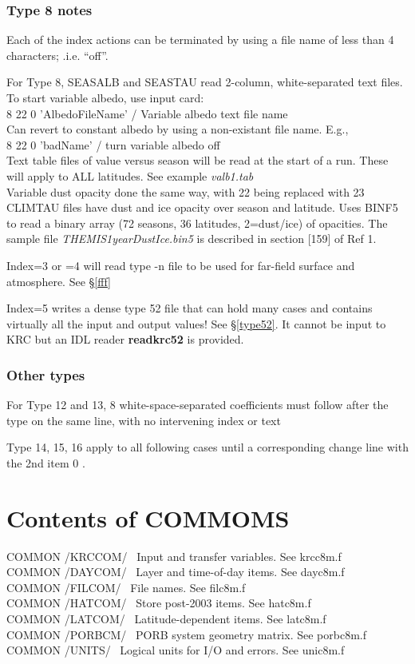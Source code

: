\documentclass{article}
\newcommand{\qi}{\\ \hspace*{2.em}}      %
\newcommand{\np}{\textbf}  %
\newcommand{\nf}{\textit}  %
\begin{document}
\subsubsection{Type 8 notes}

Each of the index actions can be terminated by using a file name of less than 4
characters; .i.e. ``off''.

For Type 8, SEASALB and SEASTAU read 2-column, white-separated text files. \\
To start variable albedo, use input card: 
\qi  8 22 0 'AlbedoFileName' / Variable albedo text file name \\
Can revert to constant albedo by using a non-existant file name. E.g.,
\qi  8 22 0 'badName' / turn variable albedo off \\
Text table files of value versus season will be read at the start of a
run. These will apply to ALL latitudes. See example  \nf{valb1.tab}   \\
Variable dust opacity done the same way, with 22 being replaced with 23 \\

CLIMTAU files have dust and ice opacity over season and latitude. Uses BINF5 to
read a binary array (72 seasons, 36 latitudes, 2=dust/ice) of opacities. The
sample file \nf{THEMIS1yearDustIce.bin5} is described in section [159] of Ref 1.

Index=3 or =4 will read type -n file to be used for far-field surface and atmosphere.  See \S \ref{fff}

Index=5 writes a dense type 52 file that can hold many cases and contains virtually all the input and output values! See \S \ref{type52}. It cannot be input to KRC but an IDL reader \np{readkrc52} is provided.

\subsubsection{Other types}
For Type 12 and 13, 8 white-space-separated coefficients must follow after 
the type on the same line, with no intervening index or text 

Type 14, 15, 16 apply to all following cases until a corresponding change line
with the 2nd item 0 .
 

\section{Contents of COMMOMS } %
 COMMON /KRCCOM/ \ Input and transfer variables. See krcc8m.f  
\\ COMMON /DAYCOM/ \ Layer and time-of-day items. See dayc8m.f  
\\ COMMON /FILCOM/ \ File names. See filc8m.f  
\\ COMMON /HATCOM/ \ Store post-2003 items. See hatc8m.f  
\\ COMMON /LATCOM/ \ Latitude-dependent items. See latc8m.f  
\\ COMMON /PORBCM/ \ PORB system geometry matrix.  See porbc8m.f  
\\ COMMON /UNITS/ \ Logical units for I/O and errors.  See unic8m.f  \\
\end{document}
